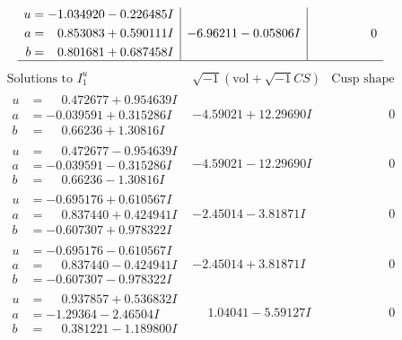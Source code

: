 \documentclass[1p]{elsarticle_modified}
\theoremstyle{definition}
\newcommand{\I}{\sqrt{-1}}
\begin{document}
$$\begin{array}{c|c|c}
\begin{aligned}
u &= -1.034920 - 0.226485 I \\
a &= \phantom{-}0.853083 + 0.590111 I \\
b &= \phantom{-}0.801681 + 0.687458 I\end{aligned}
 & -6.96211 - 0.05806 I & \phantom{-0.000000 } 0\\
 \hline 
 \end{array}$$\newpage$$\begin{array}{c|c|c}  
\text{Solutions to }I^u_{1}& \I (\text{vol} + \sqrt{-1}CS) & \text{Cusp shape}\\
 \hline 
\begin{aligned}
u &= \phantom{-}0.472677 + 0.954639 I \\
a &= -0.039591 + 0.315286 I \\
b &= \phantom{-}0.66236 + 1.30816 I\end{aligned}
 & -4.59021 + 12.29690 I & \phantom{-0.000000 } 0 \\ \hline\begin{aligned}
u &= \phantom{-}0.472677 - 0.954639 I \\
a &= -0.039591 - 0.315286 I \\
b &= \phantom{-}0.66236 - 1.30816 I\end{aligned}
 & -4.59021 - 12.29690 I & \phantom{-0.000000 } 0 \\ \hline\begin{aligned}
u &= -0.695176 + 0.610567 I \\
a &= \phantom{-}0.837440 + 0.424941 I \\
b &= -0.607307 + 0.978322 I\end{aligned}
 & -2.45014 - 3.81871 I & \phantom{-0.000000 } 0 \\ \hline\begin{aligned}
u &= -0.695176 - 0.610567 I \\
a &= \phantom{-}0.837440 - 0.424941 I \\
b &= -0.607307 - 0.978322 I\end{aligned}
 & -2.45014 + 3.81871 I & \phantom{-0.000000 } 0 \\ \hline\begin{aligned}
u &= \phantom{-}0.937857 + 0.536832 I \\
a &= -1.29364 - 2.46504 I \\
b &= \phantom{-}0.381221 - 1.189800 I\end{aligned}
 & \phantom{-}1.04041 - 5.59127 I & \phantom{-0.000000 } 0 \\ \hline\begin{aligned}

\end{aligned}
\end{array}$$
\end{document}
